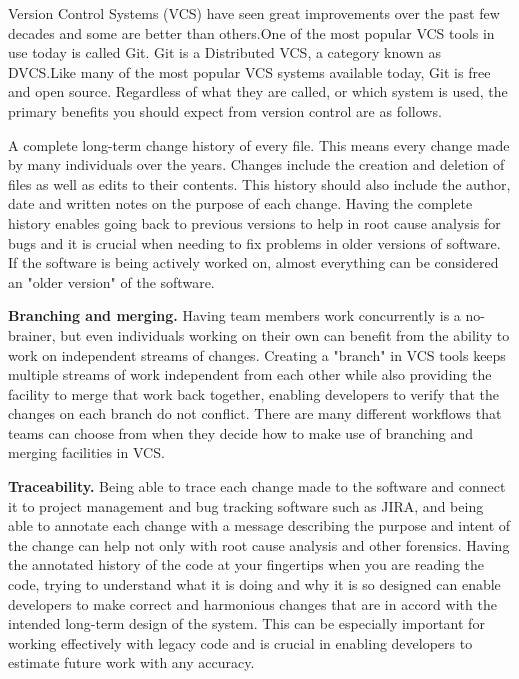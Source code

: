 \documentclass[twoside]{article}
\begin{document}
\begin{multicols}{2}
Version Control Systems (VCS) have seen great improvements over the past few decades and some are better than others.One of the most popular VCS tools in use today is called Git. Git is a Distributed VCS, a category known as DVCS.Like many of the most popular VCS systems available today, Git is free and open source. Regardless of what they are called, or which system is used, the primary benefits you should expect from version control are as follows.
\begin{compactitem}
\item A complete long-term change history of every file. This means every change made by many individuals over the years. Changes include the creation and deletion of files as well as edits to their contents. This history should also include the author, date and written notes on the purpose of each change. Having the complete history enables going back to previous versions to help in root cause analysis for bugs and it is crucial when needing to fix problems in older versions of software. If the software is being actively worked on, almost everything can be considered an "older version" of the software.
\item \textbf{Branching and merging.} Having team members work concurrently is a no-brainer, but even individuals working on their own can benefit from the ability to work on independent streams of changes. Creating a "branch" in VCS tools keeps multiple streams of work independent from each other while also providing the facility to merge that work back together, enabling developers to verify that the changes on each branch do not conflict. There are many different workflows that teams can choose from when they decide how to make use of branching and merging facilities in VCS.

\item \textbf{Traceability.} Being able to trace each change made to the software and connect it to project management and bug tracking software such as JIRA, and being able to annotate each change with a message describing the purpose and intent of the change can help not only with root cause analysis and other forensics. Having the annotated history of the code at your fingertips when you are reading the code, trying to understand what it is doing and why it is so designed can enable developers to make correct and harmonious changes that are in accord with the intended long-term design of the system. This can be especially important for working effectively with legacy code and is crucial in enabling developers to estimate future work with any accuracy.\\
\end{compactitem}


\end{multicols}
\end{document}
